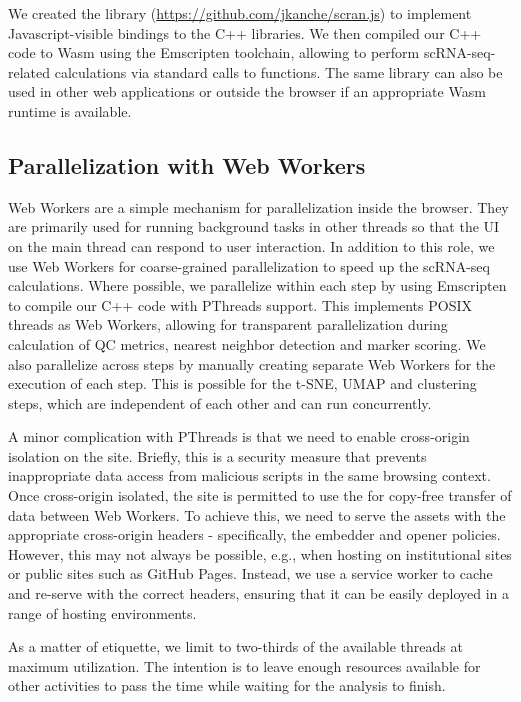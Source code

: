 \documentclass{article}
\begin{document}
We created the  library (\url{https://github.com/jkanche/scran.js}) to implement Javascript-visible bindings to the C++ libraries.
We then compiled our C++ code to Wasm using the Emscripten toolchain, allowing  to perform scRNA-seq-related calculations via standard calls to  functions.
The same library can also be used in other web applications or outside the browser if an appropriate Wasm runtime is available.


\subsection{Parallelization with Web Workers}

Web Workers are a simple mechanism for parallelization inside the browser.
They are primarily used for running background tasks in other threads so that the UI on the main thread can respond to user interaction.
In addition to this role, we use Web Workers for coarse-grained parallelization to speed up the scRNA-seq calculations.
Where possible, we parallelize within each step by using Emscripten to compile our C++ code with PThreads support.
This implements POSIX threads as Web Workers, allowing for transparent parallelization during calculation of QC metrics, nearest neighbor detection and marker scoring.
We also parallelize across steps by manually creating separate Web Workers for the execution of each step.
This is possible for the t-SNE, UMAP and clustering steps, which are independent of each other and can run concurrently.

A minor complication with PThreads is that we need to enable cross-origin isolation on the  site.
Briefly, this is a security measure that prevents inappropriate data access from malicious scripts in the same browsing context.
Once cross-origin isolated, the site is permitted to use the  for copy-free transfer of data between Web Workers.
To achieve this, we need to serve the  assets with the appropriate cross-origin headers - specifically, the embedder and opener policies.
However, this may not always be possible, e.g., when hosting on institutional sites or public sites such as GitHub Pages.
Instead, we use a service worker to cache and re-serve  with the correct headers,
ensuring that it can be easily deployed in a range of hosting environments.

As a matter of etiquette, we limit  to two-thirds of the available threads at maximum utilization.
The intention is to leave enough resources available for other activities to pass the time while waiting for the analysis to finish.
\end{document}
